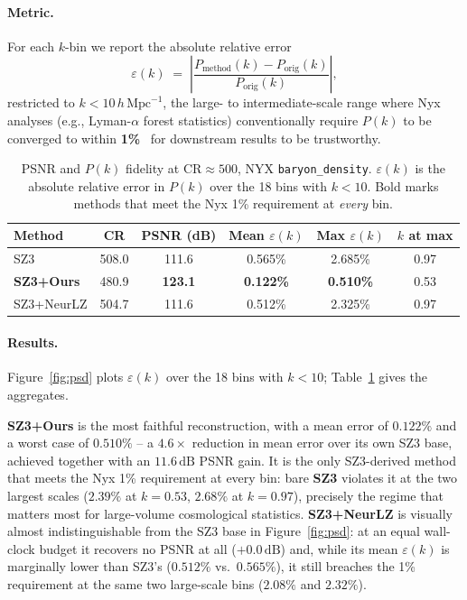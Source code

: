 \paragraph{Metric.} For each $k$-bin we report the absolute relative
error
\[
  \varepsilon(k) \;=\; \left| \frac{P_{\text{method}}(k) - P_{\text{orig}}(k)}{P_{\text{orig}}(k)} \right|,
\]
restricted to $k < 10\,h\,\mathrm{Mpc}^{-1}$, the large- to
intermediate-scale range where Nyx analyses (e.g., Lyman-$\alpha$ forest
statistics) conventionally require $P(k)$ to be converged to within
\textbf{1\%}~\cite{lukic2015nyx} for downstream results to be trustworthy.

\begin{table}[t]
  \centering
  \caption{PSNR and $P(k)$ fidelity at $\mathrm{CR}\approx500$, NYX
  \texttt{baryon\_density}. $\varepsilon(k)$ is the absolute relative
  error in $P(k)$ over the 18 bins with $k<10$. Bold marks methods that
  meet the Nyx 1\% requirement at \emph{every} bin.}
  \label{tab:psd-relerr}
  \begin{tabular}{lccccc}
    \toprule
    Method & CR & PSNR (dB) & Mean $\varepsilon(k)$ & Max $\varepsilon(k)$ & $k$ at max \\
    \midrule
    SZ3                   & 508.0 & 111.6 & 0.565\% & 2.685\% & 0.97 \\
    \textbf{SZ3+Ours}     & 480.9 & \textbf{123.1} & \textbf{0.122\%} & \textbf{0.510\%} & 0.53 \\
    SZ3+NeurLZ            & 504.7 & 111.6 & 0.512\% & 2.325\% & 0.97 \\
    \bottomrule
  \end{tabular}
\end{table}

\paragraph{Results.} Figure~\ref{fig:psd} plots $\varepsilon(k)$ over the
18 bins with $k<10$; Table~\ref{tab:psd-relerr} gives the aggregates.

\textbf{SZ3+Ours} is the most faithful reconstruction, with a mean error
of $0.122\%$ and a worst case of $0.510\%$ -- a $4.6\times$ reduction in
mean error over its own SZ3 base, achieved together with an
$11.6\,\mathrm{dB}$ PSNR gain. It is the only SZ3-derived method that
meets the Nyx 1\% requirement at every bin: bare \textbf{SZ3} violates it
at the two largest scales ($2.39\%$ at $k=0.53$, $2.68\%$ at $k=0.97$),
precisely the regime that matters most for large-volume cosmological
statistics. \textbf{SZ3+NeurLZ} is visually almost indistinguishable from
the SZ3 base in Figure~\ref{fig:psd}: at an equal wall-clock budget it
recovers no PSNR at all ($+0.0\,\mathrm{dB}$) and, while its mean
$\varepsilon(k)$ is marginally lower than SZ3's ($0.512\%$ vs.\
$0.565\%$), it still breaches the 1\% requirement at the same two
large-scale bins ($2.08\%$ and $2.32\%$).

